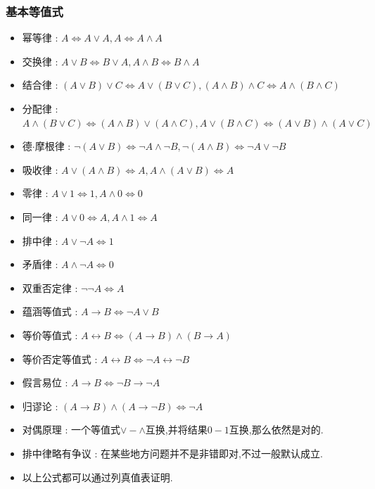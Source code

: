 \documentclass[UTF8,12pt]{ctexbook}
\begin{document}
{{{{  \subsubsection{基本等值式}{
    \begin{itemize}
      \item 幂等律 : $A \Leftrightarrow A \lor A,A \Leftrightarrow A \land A$
      \item 交换律 : $A \lor B \Leftrightarrow B \lor A,A \land B \Leftrightarrow B \land A$
      \item 结合律 : $(A \lor B) \lor C \Leftrightarrow A \lor (B \lor C),(A \land B) \land C \Leftrightarrow A \land (B \land C)$
      \item 分配律 : $A \land (B \lor C) \Leftrightarrow (A \land B) \lor (A \land C),A \lor (B \land C) \Leftrightarrow (A \lor B) \land (A \lor C)$
      \item 德$\cdot$摩根律 : $\lnot (A \lor B) \Leftrightarrow \lnot A \land \lnot B,\lnot (A \land B) \Leftrightarrow \lnot A \lor \lnot B$
      \item 吸收律 : $A \lor (A \land B) \Leftrightarrow A,A \land (A \lor B) \Leftrightarrow A$
      \item 零律 : $A \lor 1 \Leftrightarrow 1,A \land 0 \Leftrightarrow 0$
      \item 同一律 : $A \lor 0 \Leftrightarrow A,A \land 1 \Leftrightarrow A$
      \item 排中律 : $A \lor \lnot A \Leftrightarrow 1$
      \item 矛盾律 : $A \land \lnot A \Leftrightarrow 0$
      \item 双重否定律 : $\lnot \lnot A \Leftrightarrow A$
      \item 蕴涵等值式 : $A \to B \Leftrightarrow \lnot A \lor B$
      \item 等价等值式 : $A \longleftrightarrow B \Leftrightarrow (A \to B) \land (B \to A)$
      \item 等价否定等值式 : $A \longleftrightarrow B \Leftrightarrow \lnot A \longleftrightarrow \lnot B$
      \item 假言易位 : $A \to B \Leftrightarrow \lnot B \to \lnot A$
      \item 归谬论 : $(A \to B) \land (A \to \lnot B) \Leftrightarrow \lnot A$
      \item 对偶原理 : 一个等值式$\lor - \land$互换,并将结果$0 - 1$互换,那么依然是对的.
      \item 排中律略有争议 : 在某些地方问题并不是非错即对,不过一般默认成立.
      \item 以上公式都可以通过列真值表证明.
    \end{itemize}
  }%

}}}}
\end{document}
